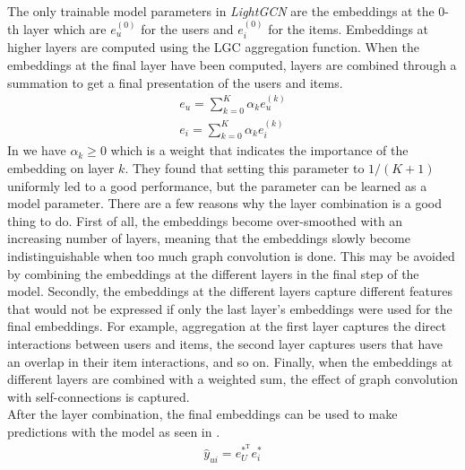 \\
The only trainable model parameters in \textit{LightGCN} are the embeddings at the 0-th layer which are $e_{u}^{(0)}$ for the users and $e_{i}^{(0)}$ for the items.
Embeddings at higher layers are computed using the LGC aggregation function. 
When the embeddings at the final layer have been computed, layers are combined through a summation to get a final presentation of the users and items.
\begin{align}\label{eqn:lgcn-layer-comb}
    e_{u} = \sum_{k=0}^K \alpha_k e_{u}^{(k)} \nonumber\\
    e_{i} = \sum_{k=0}^K \alpha_k e_{i}^{(k)}
\end{align}
In  we have $\alpha_k \geq 0$ which is a weight that indicates the importance of the embedding on layer $k$.
They found that setting this parameter to $1/(K+1)$ uniformly led to a good performance, but the parameter can be learned as a model parameter.
There are a few reasons why the layer combination is a good thing to do.
First of all, the embeddings become over-smoothed with an increasing number of layers, meaning that the embeddings slowly become indistinguishable when too much graph convolution is done.
This may be avoided by combining the embeddings at the different layers in the final step of the model.
Secondly, the embeddings at the different layers capture different features that would not be expressed if only the last layer's embeddings were used for the final embeddings.
For example, aggregation at the first layer captures the direct interactions between users and items, the second layer captures users that have an overlap in their item interactions, and so on.
Finally, when the embeddings at different layers are combined with a weighted sum, the effect of graph convolution with self-connections is captured.
\\
After the layer combination, the final embeddings can be used to make predictions with the model as seen in .
\begin{align}\label{eqn:lgcn-pred}
    \hat{y}_{ui} = e_U^{*^\textrm{T}} e_i^*
\end{align}
